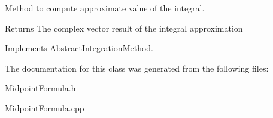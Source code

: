 Method to compute approximate value of the integral. 

\begin{DoxyReturn}{Returns}
The complex vector result of the integral approximation 
\end{DoxyReturn}


Implements \hyperlink{class_abstract_integration_method_af76e5bdce7d0b139d07e920fa29c1c34}{Abstract\+Integration\+Method}.



The documentation for this class was generated from the following files\+:\begin{DoxyCompactItemize}
\item 
Midpoint\+Formula.\+h\item 
Midpoint\+Formula.\+cpp\end{DoxyCompactItemize}
